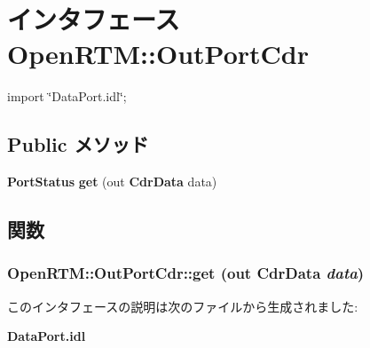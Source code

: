 \section{インタフェース OpenRTM::OutPortCdr}
\label{interfaceOpenRTM_1_1OutPortCdr}


{\ttfamily import \char`\"{}DataPort.idl\char`\"{};}

\subsection*{Public メソッド}
\begin{DoxyCompactItemize}
\item 
{\bf PortStatus} {\bf get} (out {\bf CdrData} data)
\end{DoxyCompactItemize}


\subsection{関数}
\subsubsection[{get}]{ OpenRTM::OutPortCdr::get (out {\bf CdrData} {\em data})}\label{interfaceOpenRTM_1_1OutPortCdr_a28570fbad908079a88059498845aa417}


このインタフェースの説明は次のファイルから生成されました:\begin{DoxyCompactItemize}
\item 
{\bf DataPort.idl}\end{DoxyCompactItemize}
